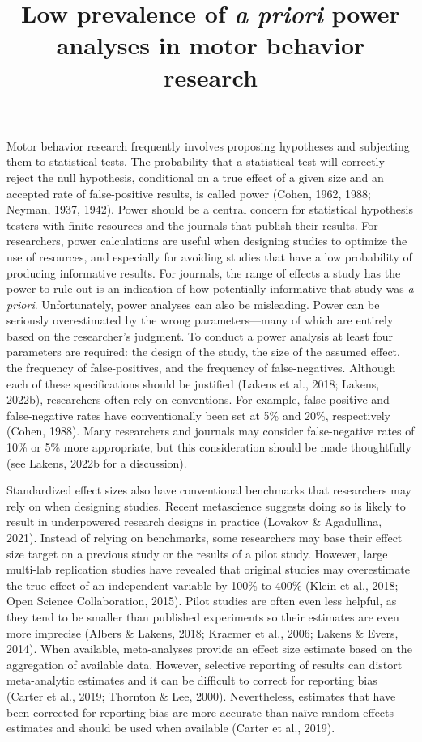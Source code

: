 \documentclass[
  man, donotrepeattitle,mask,floatsintext]{apa7}
\title{Low prevalence of \emph{a priori} power analyses in motor behavior research}
\author{\phantom{0}}
\date{}
\affiliation{\phantom{0}}
\begin{document}
\maketitle

Motor behavior research frequently involves proposing hypotheses and subjecting them to statistical tests. The probability that a statistical test will correctly reject the null hypothesis, conditional on a true effect of a given size and an accepted rate of false-positive results, is called power (Cohen, 1962, 1988; Neyman, 1937, 1942). Power should be a central concern for statistical hypothesis testers with finite resources and the journals that publish their results. For researchers, power calculations are useful when designing studies to optimize the use of resources, and especially for avoiding studies that have a low probability of producing informative results. For journals, the range of effects a study has the power to rule out is an indication of how potentially informative that study was \emph{a priori}. Unfortunately, power analyses can also be misleading. Power can be seriously overestimated by the wrong parameters---many of which are entirely based on the researcher's judgment. To conduct a power analysis at least four parameters are required: the design of the study, the size of the assumed effect, the frequency of false-positives, and the frequency of false-negatives. Although each of these specifications should be justified (Lakens et al., 2018; Lakens, 2022b), researchers often rely on conventions. For example, false-positive and false-negative rates have conventionally been set at 5\% and 20\%, respectively (Cohen, 1988). Many researchers and journals may consider false-negative rates of 10\% or 5\% more appropriate, but this consideration should be made thoughtfully (see Lakens, 2022b for a discussion).

Standardized effect sizes also have conventional benchmarks that researchers may rely on when designing studies. Recent metascience suggests doing so is likely to result in underpowered research designs in practice (Lovakov \& Agadullina, 2021). Instead of relying on benchmarks, some researchers may base their effect size target on a previous study or the results of a pilot study. However, large multi-lab replication studies have revealed that original studies may overestimate the true effect of an independent variable by 100\% to 400\% (Klein et al., 2018; Open Science Collaboration, 2015). Pilot studies are often even less helpful, as they tend to be smaller than published experiments so their estimates are even more imprecise (Albers \& Lakens, 2018; Kraemer et al., 2006; Lakens \& Evers, 2014). When available, meta-analyses provide an effect size estimate based on the aggregation of available data. However, selective reporting of results can distort meta-analytic estimates and it can be difficult to correct for reporting bias (Carter et al., 2019; Thornton \& Lee, 2000). Nevertheless, estimates that have been corrected for reporting bias are more accurate than naïve random effects estimates and should be used when available (Carter et al., 2019).
\end{document}
